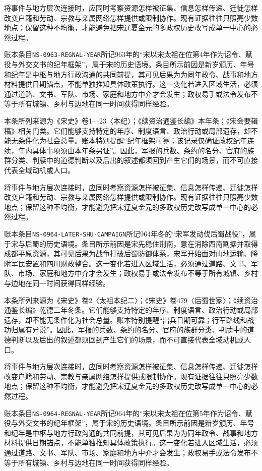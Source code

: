 将事件与地方层次连接时，应同时考察资源怎样被征集、信息怎样传递、迁徙怎样改变户籍和劳动、宗教与亲属网络怎样提供或限制协作。现有证据往往只照亮少数地点；保留这种不均衡，才能避免把宋辽夏金元的多政权历史改写成单一中心的必然过程。

账本条目\texttt{NS-0963-REGNAL-YEAR}所记963年的“宋以宋太祖在位第4年作为诏令、赋役与外交文书的纪年框架”，属于宋的历史语境。条目所示前因是新岁颁历、年号和纪年是中枢与地方行政沟通的共同前提，其可见后果为为同年政令、战事和地方材料提供日期锚点，不能单独推知具体政策执行。这一变化若进入区域生活，必须通过道路、文书、军队、市场、家庭和地方中介才会发生；政权易手或法令发布不等于所有城镇、乡村与边地在同一时间获得同样经验。

本条所列来源为《宋史》卷1—23〈本纪〉；《续资治通鉴长编》本年条；《宋会要辑稿》相关门类。它们能够支持特定的年序、制度语言、政治行动或局部遗存，却不能无条件化为社会总量。账本特别提醒“纪年框架可靠；该记录仅确证政权纪年连续，年内具体事项须由本年条另证”。因此，军报的兵数、条约的名分、官府的族群分类、判牍中的道德判断以及后出的叙述都须回到产生它们的场景，而不可直接代表全域动机或人口。

将事件与地方层次连接时，应同时考察资源怎样被征集、信息怎样传递、迁徙怎样改变户籍和劳动、宗教与亲属网络怎样提供或限制协作。现有证据往往只照亮少数地点；保留这种不均衡，才能避免把宋辽夏金元的多政权历史改写成单一中心的必然过程。

账本条目\texttt{NS-0964-LATER-SHU-CAMPAIGN}所记964年冬的“宋军发动伐后蜀战役”，属于宋与后蜀的历史语境。条目所示前因是宋先稳住荆南，意在消除西南割据并取得成都平原资源，其可见后果为战争打破后蜀防御体系，宋军开始面对山地运输、降附军民安置和四川财政整合。这一变化若进入区域生活，必须通过道路、文书、军队、市场、家庭和地方中介才会发生；政权易手或法令发布不等于所有城镇、乡村与边地在同一时间获得同样经验。

本条所列来源为《宋史》卷2〈太祖本纪二〉；《宋史》卷479〈后蜀世家〉；《续资治通鉴长编》乾德二年冬条。它们能够支持特定的年序、制度语言、政治行动或局部遗存，却不能无条件化为社会总量。账本特别提醒“出兵日期可靠；行军路线和战功归属有异说”。因此，军报的兵数、条约的名分、官府的族群分类、判牍中的道德判断以及后出的叙述都须回到产生它们的场景，而不可直接代表全域动机或人口。

将事件与地方层次连接时，应同时考察资源怎样被征集、信息怎样传递、迁徙怎样改变户籍和劳动、宗教与亲属网络怎样提供或限制协作。现有证据往往只照亮少数地点；保留这种不均衡，才能避免把宋辽夏金元的多政权历史改写成单一中心的必然过程。

账本条目\texttt{NS-0964-REGNAL-YEAR}所记964年的“宋以宋太祖在位第5年作为诏令、赋役与外交文书的纪年框架”，属于宋的历史语境。条目所示前因是新岁颁历、年号和纪年是中枢与地方行政沟通的共同前提，其可见后果为为同年政令、战事和地方材料提供日期锚点，不能单独推知具体政策执行。这一变化若进入区域生活，必须通过道路、文书、军队、市场、家庭和地方中介才会发生；政权易手或法令发布不等于所有城镇、乡村与边地在同一时间获得同样经验。

